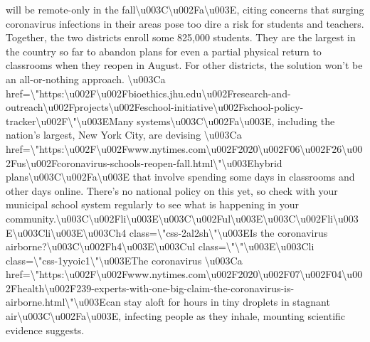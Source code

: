will be remote-only in the
fall\textbackslash{}u003C\textbackslash{}u002Fa\textbackslash{}u003E,
citing concerns that surging coronavirus infections in their areas pose
too dire a risk for students and teachers. Together, the two districts
enroll some 825,000 students. They are the largest in the country so far
to abandon plans for even a partial physical return to classrooms when
they reopen in August. For other districts, the solution won't be an
all-or-nothing approach. \textbackslash{}u003Ca
href=\textbackslash{}"https:\textbackslash{}u002F\textbackslash{}u002Fbioethics.jhu.edu\textbackslash{}u002Fresearch-and-outreach\textbackslash{}u002Fprojects\textbackslash{}u002Feschool-initiative\textbackslash{}u002Fschool-policy-tracker\textbackslash{}u002F\textbackslash{}"\textbackslash{}u003EMany
systems\textbackslash{}u003C\textbackslash{}u002Fa\textbackslash{}u003E,
including the nation's largest, New York City, are devising
\textbackslash{}u003Ca
href=\textbackslash{}"https:\textbackslash{}u002F\textbackslash{}u002Fwww.nytimes.com\textbackslash{}u002F2020\textbackslash{}u002F06\textbackslash{}u002F26\textbackslash{}u002Fus\textbackslash{}u002Fcoronavirus-schools-reopen-fall.html\textbackslash{}"\textbackslash{}u003Ehybrid
plans\textbackslash{}u003C\textbackslash{}u002Fa\textbackslash{}u003E
that involve spending some days in classrooms and other days online.
There's no national policy on this yet, so check with your municipal
school system regularly to see what is happening in your
community.\textbackslash{}u003C\textbackslash{}u002Fli\textbackslash{}u003E\textbackslash{}u003C\textbackslash{}u002Ful\textbackslash{}u003E\textbackslash{}u003C\textbackslash{}u002Fli\textbackslash{}u003E\textbackslash{}u003Cli\textbackslash{}u003E\textbackslash{}u003Ch4
class=\textbackslash{}"css-2al2sh\textbackslash{}"\textbackslash{}u003EIs
the coronavirus
airborne?\textbackslash{}u003C\textbackslash{}u002Fh4\textbackslash{}u003E\textbackslash{}u003Cul
class=\textbackslash{}"\textbackslash{}"\textbackslash{}u003E\textbackslash{}u003Cli
class=\textbackslash{}"css-1yyoic1\textbackslash{}"\textbackslash{}u003EThe
coronavirus \textbackslash{}u003Ca
href=\textbackslash{}"https:\textbackslash{}u002F\textbackslash{}u002Fwww.nytimes.com\textbackslash{}u002F2020\textbackslash{}u002F07\textbackslash{}u002F04\textbackslash{}u002Fhealth\textbackslash{}u002F239-experts-with-one-big-claim-the-coronavirus-is-airborne.html\textbackslash{}"\textbackslash{}u003Ecan
stay aloft for hours in tiny droplets in stagnant
air\textbackslash{}u003C\textbackslash{}u002Fa\textbackslash{}u003E,
infecting people as they inhale, mounting scientific evidence suggests.
